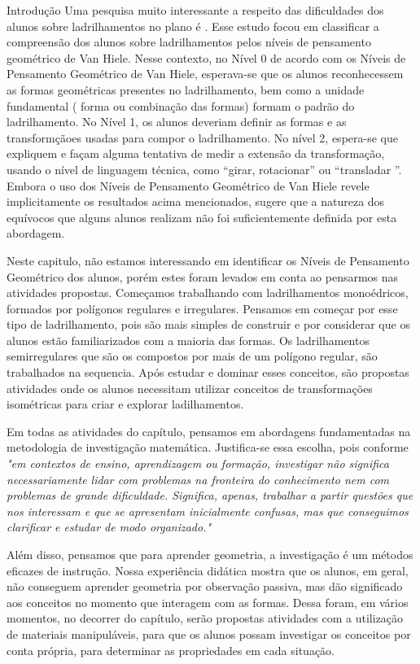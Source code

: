 \begin{apresentacao}{Introdução}
Uma pesquisa muito interessante a respeito das dificuldades dos alunos sobre ladrilhamentos no plano é \citet{cllingham}. Esse estudo focou em classificar a compreensão dos alunos sobre ladrilhamentos pelos níveis de pensamento geométrico de Van Hiele. Nesse contexto, no Nível 0 de acordo com os Níveis de Pensamento Geométrico de Van Hiele, esperava-se que os alunos reconhecessem as formas geométricas presentes no ladrilhamento, bem como a unidade fundamental ( forma ou combinação das formas) formam o padrão do ladrilhamento. No Nível 1, os alunos deveriam definir as formas e as transformçãoes  usadas para compor o ladrilhamento. No nível 2, espera-se que expliquem e façam alguma tentativa de medir a extensão da transformação, usando o nível de linguagem técnica, como “girar, rotacionar” ou “transladar ”. Embora o uso dos Níveis de Pensamento Geométrico de Van Hiele revele implicitamente os resultados acima mencionados, \citet{cllingham} sugere que a natureza dos equívocos que alguns alunos realizam não foi suficientemente definida por esta abordagem. 

Neste capitulo, não estamos interessando em identificar os Níveis de Pensamento Geométrico dos alunos, porém estes foram levados em conta ao pensarmos nas atividades propostas. Começamos trabalhando com ladrilhamentos monoédricos, formados por polígonos regulares e irregulares. Pensamos em começar por esse tipo de ladrilhamento, pois são mais simples de construir e por considerar que  os alunos estão familiarizados com a maioria das  formas. Os ladrilhamentos semirregulares que são os compostos por mais de um polígono regular, são trabalhados na sequencia. Após estudar e dominar esses conceitos, são propostas atividades onde os alunos necessitam utilizar conceitos de transformações isométricas para criar e explorar ladilhamentos.

Em todas as atividades do capítulo, pensamos em abordagens fundamentadas na metodologia de investigação matemática. Justifica-se essa escolha, pois conforme \cite[p. 92]{ponte2003} \textit{"em contextos de ensino, aprendizagem ou formação, investigar não significa necessariamente lidar com problemas na fronteira do conhecimento nem com problemas de grande dificuldade. Significa, apenas, trabalhar a partir questões que nos interessam e que se apresentam inicialmente confusas, mas que conseguimos clarificar e estudar de modo organizado." }

Além disso, pensamos que para aprender geometria, a investigação é um métodos eficazes de instrução. Nossa experiência didática mostra que os alunos, em geral, não conseguem aprender geometria por observação passiva, mas dão significado aos conceitos no momento que interagem com as formas. Dessa foram, em vários momentos, no decorrer do capítulo, serão propostas atividades com a utilização de materiais manipuláveis, para que os alunos possam investigar os conceitos por conta própria,  para determinar as propriedades em cada situação. 



\end{apresentacao}
